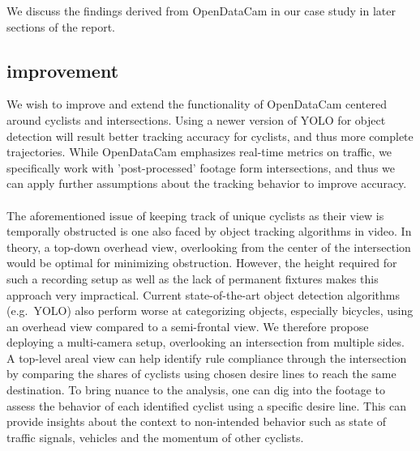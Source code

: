 We discuss the findings derived from OpenDataCam in our case study in later sections of the report.

\subsection{improvement}
We wish to improve and extend the functionality of OpenDataCam centered around cyclists and intersections.
Using a newer version of YOLO for object detection will result better tracking accuracy for cyclists, 
and thus more complete trajectories.
While OpenDataCam emphasizes real-time metrics on traffic, we specifically work with 'post-processed' footage 
form intersections, and thus we can apply further assumptions about the tracking behavior to improve accuracy.
\ \\

The aforementioned issue of keeping track of unique cyclists as their view is temporally obstructed is one also faced by 
object tracking algorithms in video. In theory, a top-down overhead view, overlooking from the center of the 
intersection would be optimal for minimizing obstruction.
However, the height required for such a recording setup as well as the lack of permanent fixtures makes this 
approach very impractical. 
Current state-of-the-art object detection algorithms (e.g.~YOLO) also perform worse at categorizing objects, 
especially bicycles, using an overhead view compared to a semi-frontal view. 
We therefore propose deploying a multi-camera setup, overlooking an intersection from multiple sides.
\ \\

A top-level areal view can help identify rule compliance through the intersection by comparing
the shares of cyclists using chosen desire lines to reach the same destination. 
To bring nuance to the analysis, one can dig into the footage to assess the behavior of 
each identified cyclist using a specific desire line. 
This can provide insights about the context to non-intended behavior such as state of traffic signals, 
vehicles and the momentum of other cyclists.